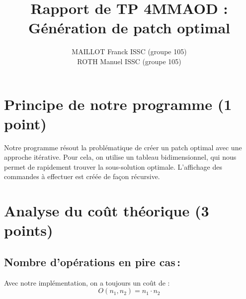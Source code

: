 \documentclass[a4paper, 10pt, french]{article}
\title{Rapport de TP 4MMAOD : Génération de patch optimal}
\author{
MAILLOT Franck ISSC (groupe 105) 
\\ ROTH Manuel ISSC (groupe 105) 
}
\begin{document}
\maketitle


\section{Principe de notre  programme (1 point)}
Notre programme résout la problématique de créer un patch optimal avec une approche itérative. Pour cela, on utilise un tableau bidimensionnel,
qui nous permet de rapidement trouver la sous-solution optimale. L'affichage des commandes à effectuer est créée de fa\c{c}on récursive.

\section{Analyse du coût théorique (3 points)}

\subsection{Nombre  d'opérations en pire cas\,: }
Avec notre implémentation, on a toujours un coût de :\\
\[
O(n_1,n_2) = n_1 \cdot n_2
\]
\end{document}
